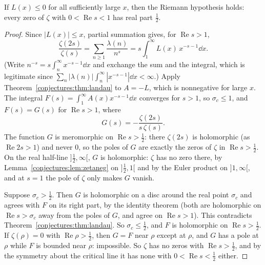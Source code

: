 \begin{theorem}[P\'olya, 1919]\label{conjectures:thm:polyarh}
If $L(x)\le0$ for all sufficiently large $x$, then the Riemann hypothesis holds: every zero of $\zeta$ with $0<\operatorname{Re}s<1$ has real part $\frac12$.
\end{theorem}
\begin{proof}
Since $|L(x)|\le x$, partial summation gives, for $\operatorname{Re}s>1$,
\[
\frac{\zeta(2s)}{\zeta(s)}=\sum_{n\ge1}\frac{\lambda(n)}{n^s}=s\int_1^\infty L(x)\,x^{-s-1}\dd x.
\]
(Write $n^{-s}=s\int_n^\infty x^{-s-1}\dd x$ and exchange the sum and the integral, which is legitimate since $\sum_n|\lambda(n)|\int_n^\infty|x^{-s-1}|\dd x<\infty$.)
Apply Theorem~\ref{conjectures:thm:landau} to $A=-L$, which is nonnegative for large $x$. The integral $F(s)=\int_1^\infty A(x)x^{-s-1}\dd x$ converges for $s>1$, so $\sigma_c\le1$,
and $F(s)=G(s)$ for $\operatorname{Re}s>1$, where
\[
G(s)=-\frac{\zeta(2s)}{s\,\zeta(s)}.
\]
The function $G$ is meromorphic on $\operatorname{Re}s>\frac12$: there $\zeta(2s)$ is holomorphic (as $\operatorname{Re}2s>1$) and never $0$, so the poles of $G$ are
exactly the zeros of $\zeta$ in $\operatorname{Re}s>\frac12$. On the real half-line $]\frac12,\infty[$, $G$ is holomorphic: $\zeta$ has no zero there, by
Lemma~\ref{conjectures:lem:zetaneg} on $]\frac12,1[$ and by the Euler product on $]1,\infty[$, and at $s=1$ the pole of $\zeta$ only makes $G$ vanish.

Suppose $\sigma_c>\frac12$. Then $G$ is holomorphic on a disc around the real point $\sigma_c$ and agrees with $F$ on its right part, by the identity theorem (both
are holomorphic on $\operatorname{Re}s>\sigma_c$ away from the poles of $G$, and agree on $\operatorname{Re}s>1$). This contradicts Theorem~\ref{conjectures:thm:landau}. So
$\sigma_c\le\frac12$, and $F$ is holomorphic on $\operatorname{Re}s>\frac12$. If $\zeta(\rho)=0$ with $\operatorname{Re}\rho>\frac12$, then $G=F$ near $\rho$ except
at $\rho$, and $G$ has a pole at $\rho$ while $F$ is bounded near $\rho$: impossible. So $\zeta$ has no zeros with $\operatorname{Re}s>\frac12$, and by the
symmetry about the critical line it has none with $0<\operatorname{Re}s<\frac12$ either.
\end{proof}

